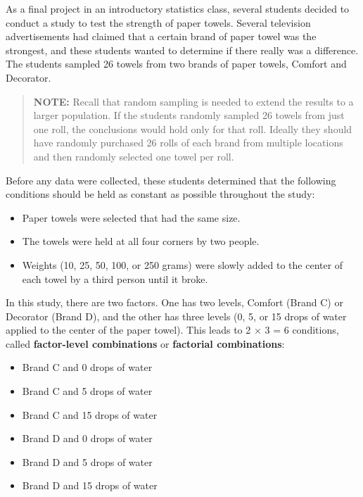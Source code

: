 \documentclass[
]{report}
\begin{document}
As a final project in an introductory statistics class, several students decided to conduct a study to test the strength of paper towels. Several television advertisements had claimed that a certain brand of paper towel was the strongest, and these students wanted to determine if there really was a difference. The students sampled 26 towels from two brands of paper towels, Comfort and Decorator.

\begin{quote}
\textbf{NOTE:} Recall that random sampling is needed to extend the results to a larger population. If the students randomly sampled 26 towels from just one roll, the conclusions would hold only for that roll. Ideally they should have randomly purchased 26 rolls of each brand from multiple locations and then randomly selected one towel per roll.
\end{quote}

Before any data were collected, these students determined that the following conditions should be held as constant as possible throughout the study:
\vspace{-1em}

\begin{itemize}
\item Paper towels were selected that had the same size.
\item The towels were held at all four corners by two people.
\item Weights (10, 25, 50, 100, or 250 grams) were slowly added to the center of each towel by a third person until it broke.
\end{itemize}

In this study, there are two factors. One has two levels, Comfort (Brand C) or Decorator (Brand D), and the other has three levels (0, 5, or 15 drops of water applied to the center of the paper towel). This leads to 2 \(\times\) 3 = 6 conditions, called \textbf{factor-level combinations} or \textbf{factorial combinations}:
\vspace{-1em}

\begin{itemize}
\item  Brand C and 0 drops of water
\item  Brand C and 5 drops of water
\item  Brand C and 15 drops of water
\item  Brand D and 0 drops of water
\item  Brand D and 5 drops of water
\item  Brand D and 15 drops of water
\end{itemize}
\end{document}
